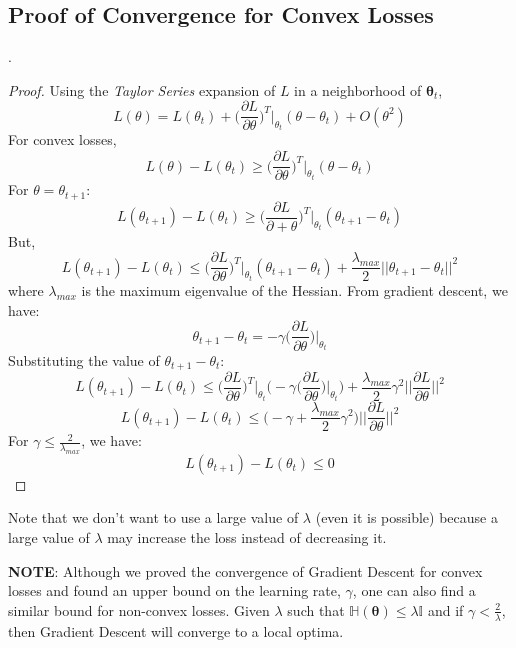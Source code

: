 \documentclass[11pt, twosides]{article}
\begin{document}
\subsection{Proof of Convergence for Convex Losses}
.
\begin{proof}
Using the \emph{Taylor Series} expansion of $L$ in a neighborhood of $\mathbf{\theta}_{t}$,
\[L(\theta) = L(\theta_t) + \bigg(\frac{\partial L}{\partial \theta}\bigg)^T\bigg|_{\theta_t}(\theta - \theta_t) + O(\theta^2)\]
For convex losses,
\[L(\theta) - L(\theta_t) \geq \bigg(\frac{\partial L}{\partial \theta}\bigg)^T\bigg|_{\theta_t}(\theta - \theta_t)\]
For $\theta = \theta_{t+1}$:
\[L(\theta_{t+1}) - L(\theta_t) \geq \bigg(\frac{\partial L}{\partial+ \theta}\bigg)^T\bigg|_{\theta_t}(\theta_{t+1} - \theta_t)\]
But,
\[L(\theta_{t+1}) - L(\theta_t) \leq \bigg(\frac{\partial L}{\partial \theta}\bigg)^T\bigg|_{\theta_t}(\theta_{t+1} - \theta_t) + \frac{\lambda_{max}}{2}||\theta_{t+1} - \theta_t||^2\]
where $\lambda_{max}$ is the maximum eigenvalue of the Hessian.
From gradient descent, we have:
\[\theta_{t+1} - \theta_t = -\gamma \bigg(\frac{\partial L}{\partial \theta}\bigg)\bigg|_{\theta_t}\]
Substituting the value of $\theta_{t+1} - \theta_t$:
\[L(\theta_{t+1}) - L(\theta_t) \leq \bigg(\frac{\partial L}{\partial \theta}\bigg)^T\bigg|_{\theta_t}\bigg(-\gamma \bigg(\frac{\partial L}{\partial \theta}\bigg)\bigg|_{\theta_t}\bigg) + \frac{\lambda_{max}}{2}\gamma^2\bigg|\bigg|\frac{\partial L}{\partial \theta}\bigg|\bigg|^2\]
\[L(\theta_{t+1}) - L(\theta_t) \leq \bigg(-\gamma + \frac{\lambda_{max}}{2}\gamma^2\bigg)\bigg|\bigg|\frac{\partial L}{\partial \theta}\bigg|\bigg|^2\]
For $\gamma \leq \frac{2}{\lambda_{max}}$, we have:
\[L(\theta_{t+1}) - L(\theta_t) \leq 0\]
\end{proof}
\begin{flushleft}
\color{blue}
Note that we don't want to use a large value of $\lambda$ (even it is possible) because a large value of $\lambda$ may increase the loss instead of decreasing it.
\end{flushleft}

\textbf{NOTE}: Although we proved the convergence of Gradient Descent for convex losses and found an upper bound on the learning rate, $\gamma$, one can also find a similar bound for non-convex losses. Given $\lambda$ such that $\mathbb{H}\left(\mathbf{\theta}\right) \leq \lambda\mathbb{I}$ and if $\gamma < \frac{2}{\lambda}$, then Gradient Descent will converge to a local optima. 
\end{document}
